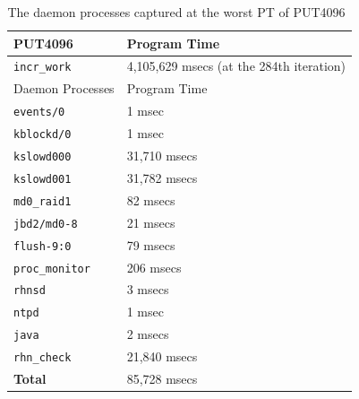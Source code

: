 \documentclass[10pt]{article}
\begin{document}
\begin{table}[htp!]
\centering
{
 \begin{tabular}{|l|l|} \hline
PUT4096 & Program Time \\ \hline
{\tt incr\_work} & 4,105,629 msecs (at the 284th iteration)\\ \hline \hline
Daemon Processes  & Program Time \\ \hline
{\tt events/0} & 1 msec\\ \hline
{\tt kblockd/0} & 1 msec\\ \hline
{\tt kslowd000} & 31,710 msecs\\ \hline
{\tt kslowd001} & 31,782 msecs\\ \hline
{\tt md0\_raid1} & 82 msecs\\ \hline
{\tt jbd2/md0-8} & 21 msecs\\ \hline
{\tt flush-9:0} & 79 msecs\\ \hline
{\tt proc\_monitor} & 206 msecs\\ \hline
{\tt rhnsd} & 3 msecs\\ \hline
{\tt ntpd} & 1 msec\\ \hline
{\tt java} & 2 msecs\\ \hline
{\tt rhn\_check} & 21,840 msecs\\ \hline \hline
{\bf Total} & 85,728 msecs\\ \hline
  \end{tabular}
  }
 \caption{The daemon processes captured at the worst PT of PUT4096~\label{fig:put4096_daemon}}
\end{table}
\end{document}
